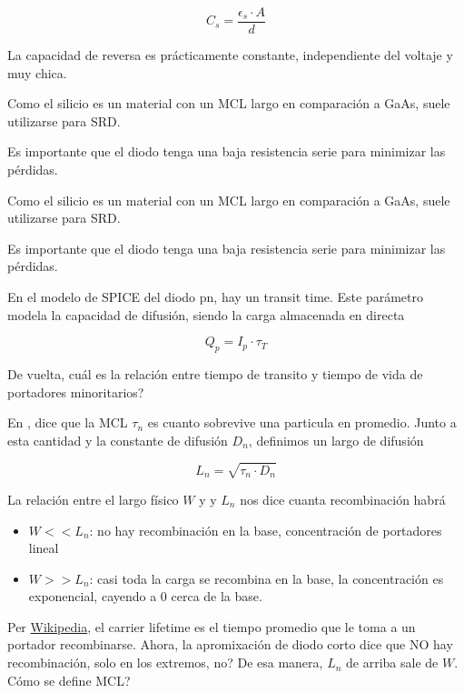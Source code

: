 \begin{equation}
    C_s = \frac{\epsilon_s \cdot A}{d}
\end{equation}

La capacidad de reversa es prácticamente constante, independiente del voltaje y
muy chica. \cite{maas2003}

Como el silicio es un material con un MCL largo en comparación a GaAs, suele
utilizarse para SRD.

Es importante que el diodo tenga una baja resistencia serie para minimizar las
pérdidas.


Como el silicio es un material con un MCL largo en comparación a GaAs, suele
utilizarse para SRD.

Es importante que el diodo tenga una baja resistencia serie para minimizar las
pérdidas.

En el modelo de SPICE del diodo pn, hay un transit time. Este parámetro modela
la capacidad de difusión, siendo la carga almacenada en directa
\cite{CMUlecture}

\begin{equation}
    Q_p = I_p \cdot \tau_T
\end{equation}

De vuelta, cuál es la relación entre tiempo de transito y tiempo de vida de
portadores minoritarios?

En \cite{CMUlecture}, dice que la MCL $\tau_n$ es cuanto sobrevive una particula
en promedio. Junto a esta cantidad y la constante de difusión $D_n$, definimos
un largo de difusión

\begin{equation}
    L_n = \sqrt{\tau_n \cdot D_n}
\end{equation}

La relación entre el largo físico $W$ y y $L_n$ nos dice cuanta recombinación
habrá

\begin{itemize}
    \item $W << L_n$: no hay recombinación en la base, concentración de
        portadores lineal
    \item $W >> L_n$: casi toda la carga se recombina en la base, la
        concentración es exponencial, cayendo a 0 cerca de la base.
\end{itemize}

Per \href{https://en.wikipedia.org/wiki/Carrier_lifetime}{Wikipedia}, el
carrier lifetime es el tiempo promedio que le toma a un portador recombinarse.
Ahora, la apromixación de diodo corto dice que NO hay recombinación, solo en los
extremos, no? De esa manera, $L_n$ de arriba sale de $W$. Cómo se define MCL?

